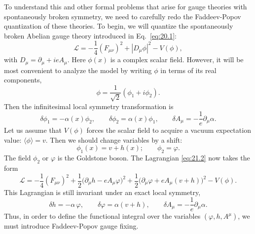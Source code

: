 To understand this and other formal problems that arise for gauge theories
with spontaneously broken symmetry, we need to carefully redo the
Faddeev-Popov quantization of these theories.  To begin, we will quantize the
spontaneously broken Abelian gauge theory introduced in Eq.~\eqref{eq:20.1}:
\begin{equation}
  \mathcal{L} = -\frac{1}{4}(F_{\mu\nu})^2 + |D_\mu\phi|^2 - V(\phi) ,
  \label{eq:21.2}
\end{equation}
with $D_\mu = \partial_\mu + ieA_\mu$.  Here $\phi(x)$ is a complex scalar
field.  However, it will be most convenient to analyze the model by writing
$\phi$ in terms of its real components,
\begin{equation}
  \phi = \frac{1}{\sqrt{2}}(\phi_1 + i\phi_2) .
  \label{eq:21.3}
\end{equation}
Then the infinitesimal local symmetry transformation is
\begin{equation}
  \delta\phi_1 = -\alpha(x)\phi_2,\qquad \delta\phi_2 = \alpha(x)\phi_1,\qquad
  \delta A_\mu = -\frac{1}{e}\partial_\mu\alpha .
  \label{eq:21.4}
\end{equation}
Let us assume that $V(\phi)$ forces the scalar field to acquire a vacuum
expectation value: $\langle\phi\rangle = v$.  Then we should change variables
by a shift:
\begin{equation}
  \phi_1(x) = v + h(x);\qquad \phi_2 = \varphi .
  \label{eq:21.5}
\end{equation}
The field $\phi_2$ or $\varphi$ is the Goldstone boson.  The Lagrangian
\eqref{eq:21.2} now takes the form
\begin{equation}
  \mathcal{L} = -\frac{1}{4}(F_{\mu\nu})^2
    + \frac{1}{2}\bigl( \partial_\mu h - eA_\mu\varphi \bigr)^2
    + \frac{1}{2}\bigl( \partial_\mu\varphi + eA_\mu(v+h) \bigr)^2
    - V(\phi) .
  \label{eq:21.6}
\end{equation}
This Lagrangian is still invariant under an exact local symmetry,
\begin{equation}
  \delta h = -\alpha\,\varphi,\qquad \delta\varphi = \alpha(v+h),\qquad
  \delta A_\mu = -\frac{1}{e}\partial_\mu\alpha .
  \label{eq:21.7}
\end{equation}
Thus, in order to define the functional integral over the variables
$(\varphi, h, A^\mu)$, we must introduce Faddeev-Popov gauge fixing.

